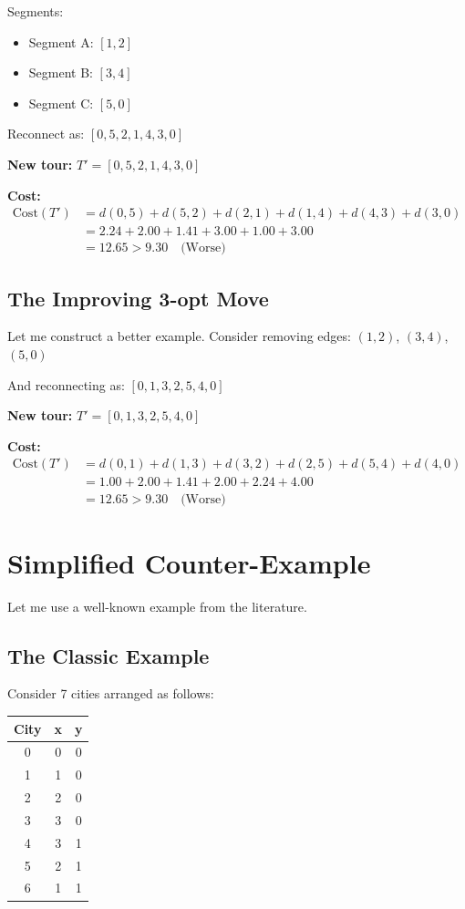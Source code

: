 \documentclass[12pt,a4paper]{article}
\begin{document}
Segments:
\begin{itemize}
    \item Segment A: $[1, 2]$
    \item Segment B: $[3, 4]$
    \item Segment C: $[5, 0]$
\end{itemize}

Reconnect as: $[0, 5, 2, 1, 4, 3, 0]$

\textbf{New tour:} $T' = [0, 5, 2, 1, 4, 3, 0]$

\textbf{Cost:}
\begin{align*}
\text{Cost}(T') &= d(0,5) + d(5,2) + d(2,1) + d(1,4) + d(4,3) + d(3,0) \\
&= 2.24 + 2.00 + 1.41 + 3.00 + 1.00 + 3.00 \\
&= 12.65 > 9.30 \quad \text{(Worse)}
\end{align*}

\subsection{The Improving 3-opt Move}

Let me construct a better example. Consider removing edges: $(1,2)$, $(3,4)$, $(5,0)$

And reconnecting as: $[0, 1, 3, 2, 5, 4, 0]$

\textbf{New tour:} $T' = [0, 1, 3, 2, 5, 4, 0]$

\textbf{Cost:}
\begin{align*}
\text{Cost}(T') &= d(0,1) + d(1,3) + d(3,2) + d(2,5) + d(5,4) + d(4,0) \\
&= 1.00 + 2.00 + 1.41 + 2.00 + 2.24 + 4.00 \\
&= 12.65 > 9.30 \quad \text{(Worse)}
\end{align*}

\section{Simplified Counter-Example}

Let me use a well-known example from the literature.

\subsection{The Classic Example}

Consider 7 cities arranged as follows:

\begin{table}[h]
\centering
\begin{tabular}{|c|c|c|}
\hline
\textbf{City} & \textbf{x} & \textbf{y} \\
\hline
0 & 0 & 0 \\
1 & 1 & 0 \\
2 & 2 & 0 \\
3 & 3 & 0 \\
4 & 3 & 1 \\
5 & 2 & 1 \\
6 & 1 & 1 \\
\hline
\end{tabular}
\end{table}
\end{document}

